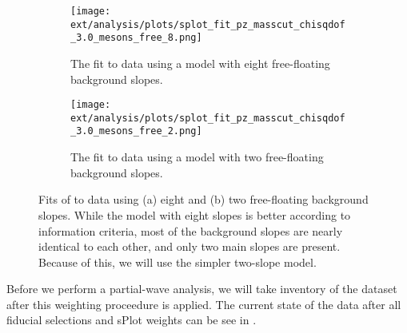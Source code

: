 




\begin{figure}
  \begin{center}
    \begin{subfigure}[t]{\textwidth}
        \begin{center}
          \texttt{[image: ext/analysis/plots/splot\_fit\_pz\_masscut\_chisqdof\_3.0\_mesons\_free\_8.png]}
        \caption{The fit to data using a model with eight free-floating background slopes.}
        \end{center}
        \end{subfigure}
        \begin{subfigure}[t]{\textwidth}
          \begin{center}
            \texttt{[image: ext/analysis/plots/splot\_fit\_pz\_masscut\_chisqdof\_3.0\_mesons\_free\_2.png]}
        \caption{The fit to data using a model with two free-floating background slopes.}
          \end{center}
        \end{subfigure}
        \caption{Fits of  to data using (a) eight and (b) two free-floating background slopes. While the model with eight slopes is better according to information criteria, most of the background slopes are nearly identical to each other, and only two main slopes are present. Because of this, we will use the simpler two-slope model.}\label{fig:splot-fits}
\end{center}
\end{figure}

Before we perform a partial-wave analysis, we will take inventory of the dataset after this weighting proceedure is applied. The current state of the data after all fiducial selections and sPlot weights can be see in .

